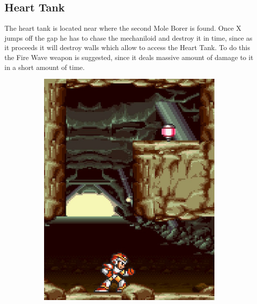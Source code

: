 \subsection{Heart Tank}
The heart tank is located near where the second Mole Borer is found. Once  X jumps off the gap he has to chase the mechaniloid and destroy it in time, since as it proceeds it will destroy walls which allow to access the Heart Tank. To do this the Fire Wave weapon is suggested, since it deals massive amount of damage to it in a short amount of time. 
\begin{figure}[htp]
	\centering
	\begin{subfigure}{0.3\linewidth}
		\centering
		\includegraphics[width=\linewidth]{figures/X1/Armored_armadillo/Armadillo_heart.jpg}
		\caption{}
	\end{subfigure}
	\begin{subfigure}{0.3\textwidth}
		\centering

\end{subfigure}
\end{figure}

